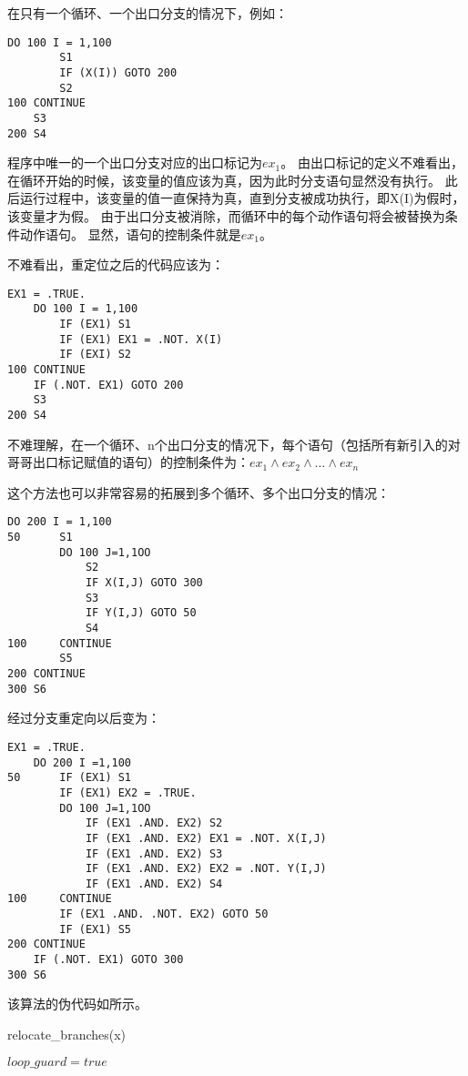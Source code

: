 在只有一个循环、一个出口分支的情况下，例如：
\begin{lstlisting}[language=FORTRAN]
	DO 100 I = 1,100
		S1
		IF (X(I)) GOTO 200
		S2
100	CONTINUE
	S3
200 S4
\end{lstlisting}

程序中唯一的一个出口分支对应的出口标记为$ex_1$。
由出口标记的定义不难看出，在循环开始的时候，该变量的值应该为真，因为此时分支语句显然没有执行。
此后运行过程中，该变量的值一直保持为真，直到分支被成功执行，即X(I)为假时，该变量才为假。
由于出口分支被消除，而循环中的每个动作语句将会被替换为条件动作语句。
显然，语句的控制条件就是$ex_1$。

不难看出，重定位之后的代码应该为：
\begin{lstlisting}[language=FORTRAN]
	EX1 = .TRUE.
	DO 100 I = 1,100
		IF (EX1) S1
		IF (EX1) EX1 = .NOT. X(I)
		IF (EXI) S2
100	CONTINUE
	IF (.NOT. EX1) GOTO 200
	S3
200	S4
\end{lstlisting}

不难理解，在一个循环、n个出口分支的情况下，每个语句（包括所有新引入的对哥哥出口标记赋值的语句）的控制条件为：$ex_1\wedge{}ex_2\wedge\ldots{}\wedge{}ex_n$

这个方法也可以非常容易的拓展到多个循环、多个出口分支的情况：
\begin{lstlisting}[language=FORTRAN]
	DO 200 I = 1,100
50		S1
		DO 100 J=1,1OO
			S2
			IF X(I,J) GOTO 300
			S3
			IF Y(I,J) GOTO 50
			S4
100		CONTINUE
		S5
200	CONTINUE
300	S6
\end{lstlisting}
经过分支重定向以后变为：
\begin{lstlisting}[language=FORTRAN]
	EX1 = .TRUE.
	DO 200 I =1,100
50		IF (EX1) S1
		IF (EX1) EX2 = .TRUE.
		DO 100 J=1,1OO
			IF (EX1 .AND. EX2) S2
			IF (EX1 .AND. EX2) EX1 = .NOT. X(I,J)
			IF (EX1 .AND. EX2) S3
			IF (EX1 .AND. EX2) EX2 = .NOT. Y(I,J)
			IF (EX1 .AND. EX2) S4
100		CONTINUE
		IF (EX1 .AND. .NOT. EX2) GOTO 50
		IF (EX1) S5
200	CONTINUE
	IF (.NOT. EX1) GOTO 300
300	S6
\end{lstlisting}
该算法的伪代码如所示。

\begin{algorithm}[H]
	\label{alg:RelocateBranch}
	\caption{relocate\_branches(x)}
	$loop\_guard = true$\;
\end{algorithm}

